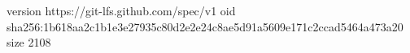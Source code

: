 version https://git-lfs.github.com/spec/v1
oid sha256:1b618aa2c1b1e3e27935c80d2e2e24c8ae5d91a5609e171c2ccad5464a473a20
size 2108

